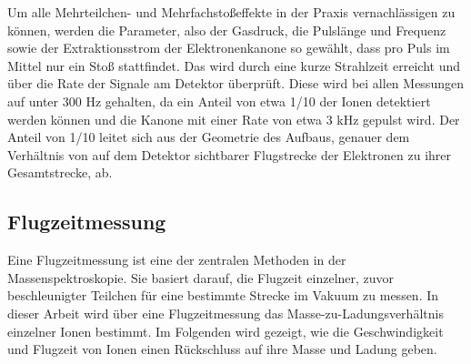 Um alle Mehrteilchen- und Mehrfachstoßeffekte in der Praxis vernachlässigen zu können, werden die Parameter, also der Gasdruck, die Pulslänge und Frequenz sowie der Extraktionsstrom der Elektronenkanone so gewählt, dass pro Puls im Mittel nur ein Stoß stattfindet. Das wird durch eine kurze Strahlzeit erreicht und über die Rate der Signale am Detektor überprüft. Diese wird bei allen Messungen auf unter 300 Hz gehalten, da ein Anteil von etwa 1/10 der Ionen detektiert werden können und die Kanone mit einer Rate von etwa 3 kHz gepulst wird. Der Anteil von 1/10 leitet sich aus der Geometrie des Aufbaus, genauer dem Verhältnis von auf dem Detektor sichtbarer Flugstrecke der Elektronen zu ihrer Gesamtstrecke, ab.

\subsection{Flugzeitmessung}
Eine Flugzeitmessung ist eine der zentralen Methoden in der Massenspektroskopie. Sie basiert darauf, die Flugzeit einzelner, zuvor beschleunigter Teilchen für eine bestimmte Strecke im Vakuum zu messen. In dieser Arbeit wird über eine Flugzeitmessung das Masse-zu-Ladungsverhältnis einzelner Ionen bestimmt. Im Folgenden wird gezeigt, wie die Geschwindigkeit und Flugzeit von Ionen einen Rückschluss auf ihre Masse und Ladung geben.

